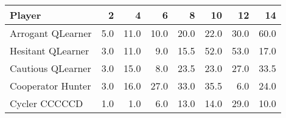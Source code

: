 \begin{tabular}{lrrrrrrr}
\toprule
            Player &    2 &     4 &     6 &     8 &    10 &    12 &    14 \\
\midrule
 Arrogant QLearner &  5.0 &  11.0 &  10.0 &  20.0 &  22.0 &  30.0 &  60.0 \\
 Hesitant QLearner &  3.0 &  11.0 &   9.0 &  15.5 &  52.0 &  53.0 &  17.0 \\
 Cautious QLearner &  3.0 &  15.0 &   8.0 &  23.5 &  23.0 &  27.0 &  33.5 \\
 Cooperator Hunter &  3.0 &  16.0 &  27.0 &  33.0 &  35.5 &   6.0 &  24.0 \\
     Cycler CCCCCD &  1.0 &   1.0 &   6.0 &  13.0 &  14.0 &  29.0 &  10.0 \\
\bottomrule
\end{tabular}
